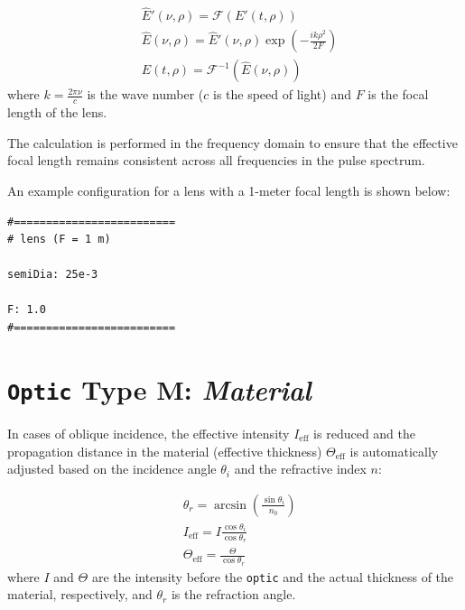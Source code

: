 \documentclass{report}
\begin{document}
\begin{equation}
 \begin{aligned}
  &\widehat{E}'(\nu,\rho) = \mathcal{F}(E'(t,\rho))\\
  &\widehat{E}(\nu,\rho) = \widehat{E}'(\nu,\rho) \exp\left( -\frac{i k \rho^2}{2 F} \right)\\
  &E(t,\rho) = \mathcal{F}^{-1}(\widehat{E}(\nu,\rho))
 \end{aligned}
\end{equation}
where \( k = \frac{2\pi\nu}{c} \) is the wave number (\( c \) is the speed of light) and \( F \) is the focal length of the lens.

The calculation is performed in the frequency domain to ensure that the effective focal length remains consistent across all frequencies in the pulse spectrum.

An example configuration for a lens with a 1-meter focal length is shown below:

\begin{verbatim}
#=========================
# lens (F = 1 m)

semiDia: 25e-3

F: 1.0
#=========================
\end{verbatim}


\section{\texttt{Optic} Type M: \textit{Material}}

In cases of oblique incidence, the effective intensity \(I_{\text{eff}}\) is reduced and the propagation distance in the material (effective thickness) \(\Theta_{\text{eff}}\) is automatically adjusted based on the incidence angle \(\theta_i\) and the refractive index \(n\):

\begin{equation}
 \begin{aligned}
   &\theta_r = \arcsin\left(\frac{\sin\theta_i}{n_0}\right)\\
   &I_{\text{eff}} = I \frac{\cos\theta_i}{\cos\theta_r}\\
   &\Theta_{\text{eff}} = \frac{\Theta}{\cos\theta_r} 
 \end{aligned}
\end{equation}
where \(I\) and \(\Theta\) are the intensity before the \texttt{optic} and the actual thickness of the material, respectively, and \(\theta_r\) is the refraction angle.
\end{document}
